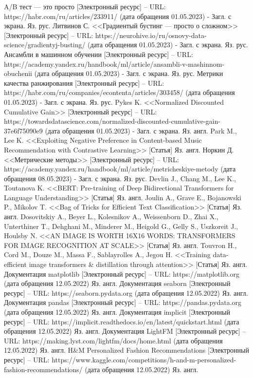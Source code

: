 \documentclass[bachelor, och, coursework]{SCWorks}
\begin{document}
\begin{thebibliography}{99}
    A/B тест — это просто [Электронный ресурс] – URL: https://habr.com/ru/articles/233911/ (дата обращения 01.05.2023) - Загл. с экрана. Яз. рус.
    Литвинов С. <<Градиентый бустинг — просто о сложном>> [Электронный ресурс] – URL: https://neurohive.io/ru/osnovy-data-science/gradientyj-busting/ (дата обращения 01.05.2023) - Загл. с экрана. Яз. рус.
    Ансамбли в машинном обучении [Электронный ресурс] – URL: https://academy.yandex.ru/handbook/ml/article/ansambli-v-mashinnom-obuchenii (дата обращения 01.05.2023) - Загл. с экрана. Яз. рус.
    Метрики качества ранжирования [Электронный ресурс] – URL: https://habr.com/ru/companies/econtenta/articles/303458/ (дата обращения 01.05.2023) - Загл. с экрана. Яз. рус.
    Pykes K. <<Normalized Discounted Cumulative Gain>> [Электронный ресурс] – URL: https://towardsdatascience.com/normalized-discounted-cumulative-gain-37e6f75090e9 (дата обращения 01.05.2023) - Загл. с экрана. Яз. англ.
    Park M., Lee K. <<Exploiting Negative Preference in Content-based Music Recommendation with Contrastive Learning>> [Статья] Яз. англ.
    Норкин Д. <<Метрические методы>> [Электронный ресурс] – URL: https://academy.yandex.ru/handbook/ml/article/metricheskiye-metody (дата обращения 08.05.2023) - Загл. с экрана. Яз. рус.
    Devlin J., Chang M., Lee K., Toutanova K. <<BERT: Pre-training of Deep Bidirectional Transformers for Language Understanding>> [Статья] Яз. англ.
    Joulin A., Grave E., Bojanowski P., Mikolov T. <<Bag of Tricks for Efficient Text Classification>> [Статья] Яз. англ.
    Dosovitskiy A., Beyer L., Kolesnikov A., Weissenborn D., Zhai X., Unterthiner T., Dehghani M., Minderer M.,
    Heigold G., Gelly S., Uszkoreit J., Houlsby N. <<AN IMAGE IS WORTH 16X16 WORDS: TRANSFORMERS FOR IMAGE RECOGNITION AT SCALE>> [Статья] Яз. англ.
    Touvron H., Cord M., Douze M., Massa F., Sablayrolles A., Jegou H. <<Training data-efficient image transformers \& distillation through attention>> [Статья] Яз. англ.
    Документация matplotlib [Электронный ресурс] – URL: https://matplotlib.org (дата обращения 12.05.2022) Яз. англ.
    Документация seaborn [Электронный ресурс] – URL: https://seaborn.pydata.org (дата обращения 12.05.2022) Яз. англ.
    Документация pandas [Электронный ресурс] – URL: https://pandas.pydata.org (дата обращения 12.05.2022) Яз. англ.
    Документация implicit [Электронный ресурс] – URL: https://implicit.readthedocs.io/en/latest/quickstart.html (дата обращения 12.05.2022) Яз. англ.
    Документация LightFM [Электронный ресурс] – URL: https://making.lyst.com/lightfm/docs/home.html (дата обращения 12.05.2022) Яз. англ.
    H\&M Personalized Fashion Recommendations [Электронный ресурс] – URL: https://www.kaggle.com/competitions/h-and-m-personalized-fashion-recommendations/ (дата обращения 12.05.2022) Яз. англ.
\end{thebibliography}
\end{document}
